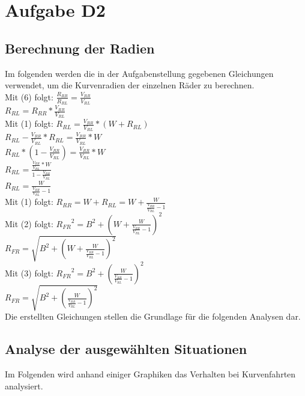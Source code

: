 \chapter{Aufgabe D2}

\section{Berechnung der Radien}
Im folgenden werden die in der Aufgabenstellung gegebenen Gleichungen verwendet, um die Kurvenradien der einzelnen Räder zu berechnen.\\

	Mit (6) folgt: $ \frac{R_{RR}}{R_{RL}} = \frac{V_{RR}}{V_{RL}}$  \\
	\hspace*{2.5cm}${R_{RL} = {R_{RR}} * \frac{V_{RR}}{V_{RL}}}$ \\
	Mit (1) folgt: ${R_{RL}} = \frac{V_{RR}}{V_{RL}} * (W+{R_{RL}})$ \\
	\hspace*{2.5cm}${R_{RL}}-\frac{V_{RR}}{V_{RL}}*{R_{RL}} = \frac{V_{RR}}{V_{RL}} * W $\\
	\hspace*{2.5cm}${R_{RL}}*(1-\frac{V_{RR}}{V_{RL}})= \frac{V_{RR}}{V_{RL}} * W $\\
	\hspace*{2.5cm}${R_{RL}}= \frac{\frac{V_{RR}}{V_{RL}} * W}{1-\frac{V_{RR}}{V_{RL}}}$ \\
	\hspace*{2.5cm}${R_{RL}}= \frac{W}{\frac{V_{RR}}{V_{RL}}-1}$ \\
	Mit (1) folgt: ${R_{RR}}= W + {R_{RL}} = W + \frac{W}{\frac{V_{RR}}{V_{RL}}-1}$ \\
	Mit (2) folgt: ${R_{FR}}^2= B^2 + (W + \frac{W}{\frac{V_{RR}}{V_{RL}}-1})^2$ \\
	\hspace*{2.5cm}${R_{FR}} = \sqrt{B^2 + (W + \frac{W}{\frac{V_{RR}}{V_{RL}}-1})^2}$ \\
	Mit (3) folgt: ${R_{FR}}^2= B^2 + (\frac{W}{\frac{V_{RR}}{V_{RL}}-1})^2$\\
	\hspace*{2.5cm}${R_{FR}} = \sqrt{B^2 + (\frac{W}{\frac{V_{RR}}{V_{RL}}-1})^2}$\\ 
	
Die erstellten Gleichungen stellen die Grundlage für die folgenden Analysen dar.
\newpage
\section{Analyse der ausgewählten Situationen}
	Im Folgenden wird anhand einiger Graphiken das Verhalten bei Kurvenfahrten analysiert.
	
